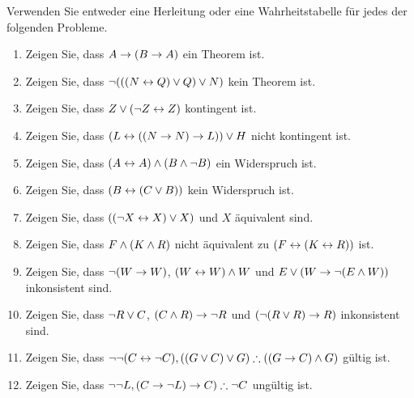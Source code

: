 \noindent\problempart Verwenden Sie entweder eine Herleitung oder eine Wahrheitstabelle für jedes der folgenden Probleme.  
\begin{enumerate}%
\item Zeigen Sie, dass $A \rightarrow (B \rightarrow A)$ ein Theorem ist.
\item Zeigen Sie, dass $\neg (((N \leftrightarrow Q) \vee Q) \vee N)$ kein Theorem ist.
\item Zeigen Sie, dass $Z \vee (\neg Z \leftrightarrow Z) $ kontingent ist.
\item Zeigen Sie, dass $ (L \leftrightarrow ((N \rightarrow N) \rightarrow L)) \vee H $ nicht kontingent ist.
\item Zeigen Sie, dass $ (A \leftrightarrow A) \wedge (B \wedge \neg B)$ ein Widerspruch ist.
\item Zeigen Sie, dass $ (B \leftrightarrow (C \vee B)) $ kein Widerspruch ist.
\item Zeigen Sie, dass $((\neg X \leftrightarrow X) \vee X)$ und $X$ äquivalent sind.
\item Zeigen Sie, dass $F \wedge (K \wedge R)$ nicht äquivalent zu $ (F \leftrightarrow (K \leftrightarrow R))$ ist.
\item Zeigen Sie, dass $ \neg (W \rightarrow W)$, $(W \leftrightarrow W) \wedge W$ und $E \vee (W \rightarrow \neg (E \wedge W))$ inkonsistent sind.
\item Zeigen Sie, dass $\neg R \vee C $, $(C \wedge R) \rightarrow \neg R$ und $(\neg (R \vee R) \rightarrow R)$ inkonsistent sind.
\item Zeigen Sie, dass $\enot \enot (C \eiff \enot C), ((G \eor C) \eor G) \therefore ((G \eif C) \eand G) $ gültig ist.
\item Zeigen Sie, dass $ \enot \enot L,  (C \eif \enot L) \eif C) \therefore \enot C$ ungültig ist. 
\end{enumerate}
